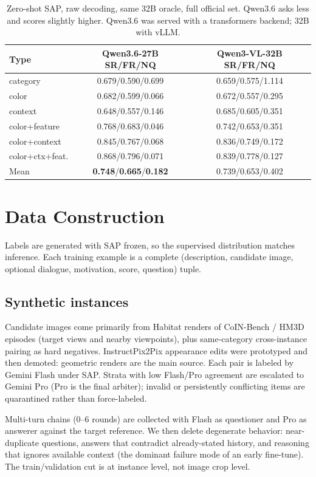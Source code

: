 \documentclass[10pt,a4paper]{article}
\begin{document}
\begin{table}[h]
\centering
\small
\begin{tabular}{lcc}
\toprule
Type & Qwen3.6-27B SR/FR/NQ & Qwen3-VL-32B SR/FR/NQ \\
\midrule
category & 0.679/0.590/0.699 & 0.659/0.575/1.114 \\
color & 0.682/0.599/0.066 & 0.672/0.557/0.295 \\
context & 0.648/0.557/0.146 & 0.685/0.605/0.351 \\
color+feature & 0.768/0.683/0.046 & 0.742/0.653/0.351 \\
color+context & 0.845/0.767/0.068 & 0.836/0.749/0.172 \\
color+ctx+feat. & 0.868/0.796/0.071 & 0.839/0.778/0.127 \\
\midrule
Mean & \textbf{0.748}/\textbf{0.665}/\textbf{0.182} & 0.739/0.653/0.402 \\
\bottomrule
\end{tabular}
\caption{Zero-shot SAP, raw decoding, same 32B oracle, full official set.
Qwen3.6 asks less and scores slightly higher. Qwen3.6 was served with a
transformers backend; 32B with vLLM.}
\label{tab:q36zs}
\end{table}

\section{Data Construction}
\label{sec:data}

Labels are generated with SAP frozen, so the supervised distribution
matches inference. Each training example is a complete
(description, candidate image, optional dialogue, motivation, score,
question) tuple.

\subsection{Synthetic instances}
Candidate images come primarily from Habitat renders of CoIN-Bench /
HM3D episodes (target views and nearby viewpoints), plus
same-category cross-instance pairing as hard negatives. InstructPix2Pix
appearance edits were prototyped and then demoted: geometric renders
are the main source. Each pair is labeled by Gemini Flash under SAP.
Strata with low Flash/Pro agreement are escalated to Gemini Pro (Pro
is the final arbiter); invalid or persistently conflicting items are
quarantined rather than force-labeled.

Multi-turn chains (0--6 rounds) are collected with Flash as questioner
and Pro as answerer against the target reference. We then delete
degenerate behavior: near-duplicate questions, answers that contradict
already-stated history, and reasoning that ignores available context
(the dominant failure mode of an early fine-tune). The
train/validation cut is at instance level, not image crop level.
\end{document}
